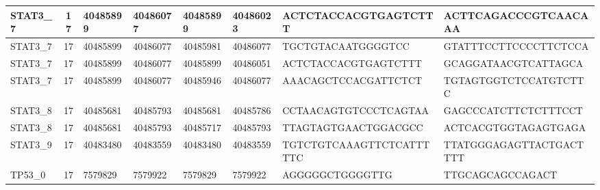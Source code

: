 \begin{landscape}
\begin{longtable}{| p{} | p{} | p{} | p{} | p{} | p{} | p{} | p{} |}
\multicolumn{1}{|l|}{STAT3\_7}   & \multicolumn{1}{c|}{17} & \multicolumn{1}{l|}{40485899}  & \multicolumn{1}{l|}{40486077}  & \multicolumn{1}{l|}{40485899}  & \multicolumn{1}{l|}{40486023}  & \multicolumn{1}{l|}{ACTCTACCACGTGAGTCTTT}            & \multicolumn{1}{l|}{ACTTCAGACCCGTCAACAAA}          \\ \hline
\multicolumn{1}{|l|}{STAT3\_7}   & \multicolumn{1}{c|}{17} & \multicolumn{1}{l|}{40485899}  & \multicolumn{1}{l|}{40486077}  & \multicolumn{1}{l|}{40485981}  & \multicolumn{1}{l|}{40486077}  & \multicolumn{1}{l|}{TGCTGTACAATGGGGTCC}              & \multicolumn{1}{l|}{GTATTTCCTTCCCCTTCTCCA}         \\ \hline
\multicolumn{1}{|l|}{STAT3\_7}   & \multicolumn{1}{c|}{17} & \multicolumn{1}{l|}{40485899}  & \multicolumn{1}{l|}{40486077}  & \multicolumn{1}{l|}{40485899}  & \multicolumn{1}{l|}{40486051}  & \multicolumn{1}{l|}{ACTCTACCACGTGAGTCTTT}            & \multicolumn{1}{l|}{GCAGGATAACGTCATTAGCA}          \\ \hline
\multicolumn{1}{|l|}{STAT3\_7}   & \multicolumn{1}{c|}{17} & \multicolumn{1}{l|}{40485899}  & \multicolumn{1}{l|}{40486077}  & \multicolumn{1}{l|}{40485946}  & \multicolumn{1}{l|}{40486077}  & \multicolumn{1}{l|}{AAACAGCTCCACGATTCTCT}            & \multicolumn{1}{l|}{TGTAGTGGTCTCCATGTCTTC}         \\ \hline
\multicolumn{1}{|l|}{STAT3\_8}   & \multicolumn{1}{c|}{17} & \multicolumn{1}{l|}{40485681}  & \multicolumn{1}{l|}{40485793}  & \multicolumn{1}{l|}{40485681}  & \multicolumn{1}{l|}{40485786}  & \multicolumn{1}{l|}{CCTAACAGTGTCCCTCAGTAA}           & \multicolumn{1}{l|}{GAGCCCATCTTCTCTTTCCT}          \\ \hline
\multicolumn{1}{|l|}{STAT3\_8}   & \multicolumn{1}{c|}{17} & \multicolumn{1}{l|}{40485681}  & \multicolumn{1}{l|}{40485793}  & \multicolumn{1}{l|}{40485717}  & \multicolumn{1}{l|}{40485793}  & \multicolumn{1}{l|}{TTAGTAGTGAACTGGACGCC}            & \multicolumn{1}{l|}{ACTCACGTGGTAGAGTGAGA}          \\ \hline
\multicolumn{1}{|l|}{STAT3\_9}   & \multicolumn{1}{c|}{17} & \multicolumn{1}{l|}{40483480}  & \multicolumn{1}{l|}{40483559}  & \multicolumn{1}{l|}{40483480}  & \multicolumn{1}{l|}{40483559}  & \multicolumn{1}{l|}{TGTCTGTCAAAGTTCTCATTTTTC}        & \multicolumn{1}{l|}{TTATGGGAGAGTTACTGACTTTT}       \\ \hline
\multicolumn{1}{|l|}{TP53\_0}    & \multicolumn{1}{c|}{17} & \multicolumn{1}{l|}{7579829}   & \multicolumn{1}{l|}{7579922}   & \multicolumn{1}{l|}{7579829}   & \multicolumn{1}{l|}{7579922}   & \multicolumn{1}{l|}{AGGGGGCTGGGGTTG}                 & \multicolumn{1}{l|}{TTGCAGCAGCCAGACT}              \\ \hline

\end{longtable}
\end{landscape}
